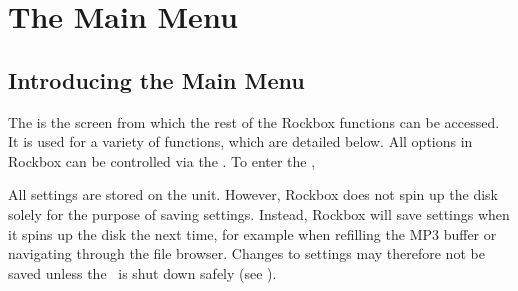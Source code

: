 \chapter{The Main Menu}

\section{Introducing the Main Menu}
The  is the screen from which the rest of the Rockbox functions can be 
accessed. It is used for a variety of functions, which are detailed below. 
All options in Rockbox can be controlled via the .
To enter the , 

All settings are stored on the unit. However, Rockbox does not spin up 
the disk solely for the purpose of saving settings.  Instead, Rockbox will
save settings when it spins up the disk the next time, for example when 
refilling the MP3 buffer or navigating through the file browser. Changes to 
settings may therefore not be saved unless the \dap\ is shut down safely 
(see ).

